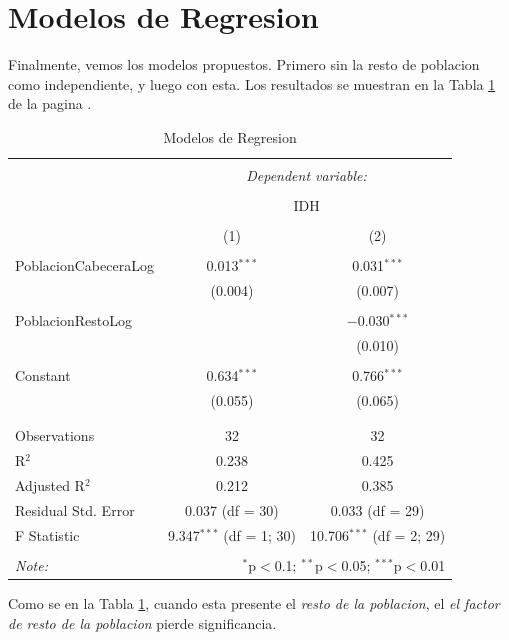 \documentclass{article}
\begin{document}
\clearpage


\section{Modelos de Regresion}

Finalmente, vemos los modelos propuestos. Primero sin la resto de poblacion como independiente, y luego con esta. Los resultados se muestran en la Tabla \ref{regresiones} de la pagina \pageref{regresiones}.




\begin{table}[!htbp] \centering 
  \caption{Modelos de Regresion} 
  \label{regresiones} 
\begin{tabular}{@{\extracolsep{5pt}}lcc} 
\\[-1.8ex]\hline 
\hline \\[-1.8ex] 
 & \multicolumn{2}{c}{\textit{Dependent variable:}} \\ 
\cline{2-3} 
\\[-1.8ex] & \multicolumn{2}{c}{IDH} \\ 
\\[-1.8ex] & (1) & (2)\\ 
\hline \\[-1.8ex] 
 PoblacionCabeceraLog & 0.013$^{***}$ & 0.031$^{***}$ \\ 
  & (0.004) & (0.007) \\ 
  & & \\ 
 PoblacionRestoLog &  & $-$0.030$^{***}$ \\ 
  &  & (0.010) \\ 
  & & \\ 
 Constant & 0.634$^{***}$ & 0.766$^{***}$ \\ 
  & (0.055) & (0.065) \\ 
  & & \\ 
\hline \\[-1.8ex] 
Observations & 32 & 32 \\ 
R$^{2}$ & 0.238 & 0.425 \\ 
Adjusted R$^{2}$ & 0.212 & 0.385 \\ 
Residual Std. Error & 0.037 (df = 30) & 0.033 (df = 29) \\ 
F Statistic & 9.347$^{***}$ (df = 1; 30) & 10.706$^{***}$ (df = 2; 29) \\ 
\hline 
\hline \\[-1.8ex] 
\textit{Note:}  & \multicolumn{2}{r}{$^{*}$p$<$0.1; $^{**}$p$<$0.05; $^{***}$p$<$0.01} \\ 
\end{tabular} 
\end{table} 
Como se en la Tabla \ref{regresiones}, cuando esta presente el \emph{resto de la poblacion}, el \emph{el factor de resto de la poblacion} pierde significancia.
\end{document}

